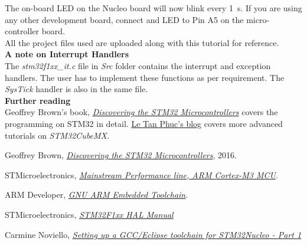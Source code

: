 \documentclass[a4paper,12pt,oneside]{book}
\begin{document}
\bigskip

The on-board LED on the Nucleo board will now blink every \SI{1}{\second}. If you are using any other development board, connect and LED to Pin A5 on the micro-controller board.\\ 

All the project files used are uploaded along with this tutorial for reference.\\

\textbf{A note on Interrupt Handlers}
\medskip
\\The \textit{stm32f1xx{\_}it.c} file in \textit{Src} folder contains the interrupt and exception handlers. The user has to implement these functions as per requirement. The \textit{SysTick} handler is also in the same file.\\

\textbf{Further reading}
\medskip
\\Geoffrey Brown's book, \href{https://www.cs.indiana.edu/~geobrown/book.pdf}{\textit{Discovering the STM32 Microcontrollers}} covers the programming on STM32 in detail. \href{http://letanphuc.net/category/stm32/}{Le Tan Phuc's blog} covers more advanced tutorials on \textit{STM32CubeMX}.\\

\begin{thebibliography}{20}

Geoffrey Brown,
\href{https://www.cs.indiana.edu/~geobrown/book.pdf}{\textit{Discovering the STM32 Microcontrollers}}, 2016.

STMicroelectronics, \href{http://www.st.com/content/st_com/en/products/microcontrollers/stm32-32-bit-arm-cortex-mcus/stm32f1-series/stm32f103/stm32f103rb.html}{\textit{Mainstream Performance line, ARM Cortex-M3 MCU}}.

ARM Developer, \href{https://developer.arm.com/open-source/gnu-toolchain/gnu-rm}{\textit{GNU ARM Embedded Toolchain}}.

STMicroelectronics, \href{./datasheets/STM32F1 HAL Manual.pdf}{\textit{STM32F1xx HAL Manual}}

Carmine Noviello, \href{http://www.carminenoviello.com/2014/12/28/setting-gcceclipse-toolchain-stm32nucleo-part-1/}{\textit{Setting up a GCC/Eclipse toolchain for STM32Nucleo - Part 1}}

\end{thebibliography}

\end{document}
